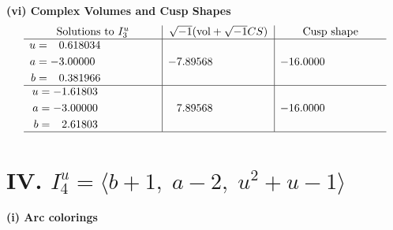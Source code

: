 \documentclass[1p]{elsarticle_modified}
\theoremstyle{definition}
\newcommand{\I}{\sqrt{-1}}
\begin{document}
\newpage\flushleft \textbf{(vi) Complex Volumes and Cusp Shapes}
$$\begin{array}{c|c|c}  
\text{Solutions to }I^u_{3}& \I (\text{vol} + \sqrt{-1}CS) & \text{Cusp shape}\\
 \hline 
\begin{aligned}
u &= \phantom{-}0.618034\phantom{ +0.000000I} \\
a &= -3.00000\phantom{ +0.000000I} \\
b &= \phantom{-}0.381966\phantom{ +0.000000I}\end{aligned}
 & -7.89568\phantom{ +0.000000I} & -16.0000\phantom{ +0.000000I} \\ \hline\begin{aligned}
u &= -1.61803\phantom{ +0.000000I} \\
a &= -3.00000\phantom{ +0.000000I} \\
b &= \phantom{-}2.61803\phantom{ +0.000000I}\end{aligned}
 & \phantom{-}7.89568\phantom{ +0.000000I} & -16.0000\phantom{ +0.000000I}\\
 \hline 
 \end{array}$$\newpage\newpage\renewcommand{\arraystretch}{1}
\centering \section*{IV. $I^u_{4}= \langle b+1,\;a-2,\;u^2+u-1 \rangle$}
\flushleft \textbf{(i) Arc colorings}\\
\end{document}
